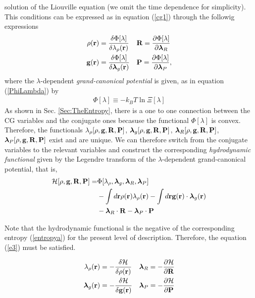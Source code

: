 \documentclass[b5paper,openright,10pt]{book}
\begin{document}
  solution of  the Liouville equation (we omit the time  dependence for simplicity). This conditions can be expressed as in equation (\ref{cg1}) through the followig expressions 
\begin{align}
  \rho({\bf r}) &=\frac{\delta \Phi [\lambda]}{\delta \lambda_\rho({\bf r}) }
&&{\bf R} =\frac{\partial \Phi [\lambda]}{\partial \boldsymbol{\lambda}_R }
\nonumber\\
  {\bf g}({\bf r}) &=\frac{\delta \Phi [\lambda]}{\delta \boldsymbol{\lambda}_g({\bf r}) }
&&{\bf P} =\frac{\partial \Phi [\lambda]}{\partial \boldsymbol{\lambda}_P },
\label{rgo}
\end{align}
where the $\lambda$-dependent {\em grand-canonical potential} is given, as in equation (\ref{PhiLambda}) by
\begin{eqnarray}
  \Phi [\lambda]\equiv-k_BT \ln\Xi [\lambda]
\label{oh}
\end{eqnarray}
As shown in Sec. \ref{Sec:TheEntropy}, there is a one to one connection between the CG variables and the conjugate ones becasuse the functional $\Phi[\lambda]$ is convex.  
Therefore, the  functionals $\lambda_{\rho}[\rho,{\bf  g},{\bf R},{\bf
  P}]$,   $\boldsymbol{\lambda}_g[\rho,{\bf   g},{\bf  R},{\bf   P}]$,
$\boldsymbol{\lambda}_R[\rho,{\bf      g},{\bf      R},{\bf      P}]$,
$\boldsymbol{\lambda}_P[\rho,{\bf g},{\bf  R},{\bf P}]$ exist  and are
unique.   We  can  therefore   switch  from  the  conjugate  variables
 to  the   relevant   variables  and  construct   the
 corresponding {\em hydrodynamic functional} given   by   the   Legendre    transform   of   the $\lambda$-dependent grand-canonical potential, that is,
\begin{align}
    {\cal H}[\rho,{\bf g},{\bf R},{\bf P}] =&
\Phi [\lambda_\rho,\boldsymbol{\lambda}_g,\boldsymbol{\lambda}_R,\boldsymbol{\lambda}_P]
\nonumber\\
    & -
\int d{\bf r}\rho({\bf r})\lambda_\rho({\bf r})
-
\int d{\bf r}{\bf g}({\bf r})\cdot\boldsymbol{\lambda}_g({\bf r})
\nonumber\\
    &    -\boldsymbol{\lambda}_R\cdot{\bf R}-\boldsymbol{\lambda}_P\cdot{\bf P}
\label{oleg}
\end{align}

Note that the hydrodynamic functional  is the negative of the corresponding entropy (\ref{entropya}) for the present level of description. Therefore, the equation (\ref{e3}) must be satisfied.

\begin{align}
  \lambda_\rho({\bf r}) &=-\frac{\delta {\cal H}}{\delta \rho({\bf r}) }
&&  \boldsymbol{\lambda}_R =-\frac{\partial {\cal H}}{\partial {\bf R} }
\nonumber\\
  \boldsymbol{\lambda}_g({\bf r}) &=-\frac{\delta {\cal H}}{\delta {\bf g}({\bf r}) }
&&  \boldsymbol{\lambda}_P =-\frac{\partial {\cal H}}{\partial{\bf P} }
\label{lno}
\end{align}
\end{document}
